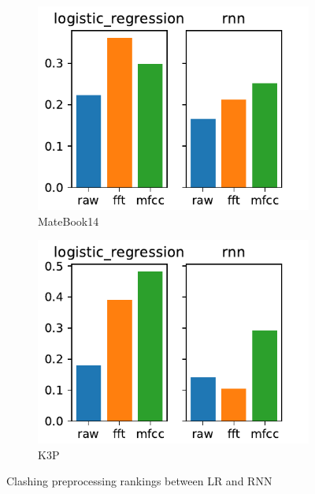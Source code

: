 \documentclass[../main.tex]{subfiles}
\begin{document}
\begin{figure}
    \centering
    \begin{subfigure}[b]{0.49\textwidth}
        \includegraphics[width=\textwidth]{figures/plots/model_comparison/custom_logistic_regression_rnn_matebook14.pdf}
        \caption{MateBook14}
        \label{fig:selective_model_comparison_logistic_regression_rnn_matebook14}
    \end{subfigure}
    \begin{subfigure}[b]{0.49\textwidth}
        \includegraphics[width=\textwidth]{figures/plots/model_comparison/custom_logistic_regression_rnn_k3p.pdf}
        \caption{K3P}
        \label{fig:selective_model_comparison_logistic_regression_rnn_k3p}
    \end{subfigure}
    \caption{Clashing preprocessing rankings between LR and RNN}
\end{figure}
\end{document}
